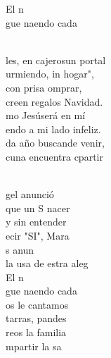 \documentclass[12pt]{article}
\begin{document}
\begin{multicols*}{2}
\begin{cancion}
\begin{chorus}
	El n\\
	gue naendo cada   \\
	\end{chorus}%
	\jump\\
	les, en cajerosun portal\\
	urmiendo, in hogar",\\
	 con prisa omprar,\\
	creen  regalos  Navidad.\\
	mo Jesúserá en mí \\
	endo a mi lado infeliz.\\
	da año buscande venir,\\
	 cuna encuentra cpartir\\\jump\\
	\begin{chorus}%
	gel anunció \\
	que un S nacer\\
	y sin entender \\
	ecir "SI", Mara\\
	s  anun \\
	la usa de estra aleg\\
	El n\\
	gue naendo cada   \\
\jump
	os le cantamos \\
	tarras, pandes\\
	reos la familia \\
	mpartir la sa\\

\end{chorus}
\end{cancion}
\end{multicols*}
\end{document}
